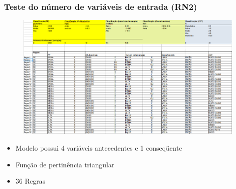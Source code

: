 \documentclass[aspectratio=169]{beamer} %
\begin{document}
{{
\begin{frame}
\frametitle{Teste do número de variáveis de entrada (RN2)} 
\begin{figure}
\centering
\includegraphics[scale=0.2]{FuzzyRN2.png}
\end{figure}
\pause
	\begin{itemize}
		\item Modelo possui 4 variáveis antecedentes e 1 conseqüente
		\pause
		\item Função de pertinência triangular
		\pause
		\item 36 Regras
	\end{itemize}
\end{frame} 
}



}
\end{document}

